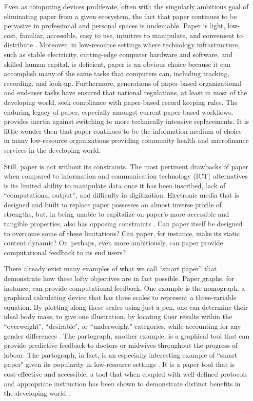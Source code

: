 \documentclass{sig-alternate}
\begin{document}
Even as computing devices proliferate, often with the singularly ambitious goal of eliminating paper from a given ecosystem, the fact that paper continues to be pervasive in professional and personal spaces is undeniable. Paper is light, low-cost, familiar, accessible, easy to use, intuitive to manipulate, and convenient to distribute \cite{sellen1997,sellen2002,johnson1993}. Moreover, in low-resource settings where technology infrastructure, such as stable electricity, cutting-edge computer hardware and software, and skilled human capital, is deficient, paper is an obvious choice because it can accomplish many of the same tasks that computers can, including tracking, recording, and look-up. Furthermore, generations of paper-based organizational and end-user tasks have ensured that national regulations, at least in most of the developing world, seek compliance with paper-based record keeping rules. The enduring legacy of paper, especially amongst current paper-based workflows, provides inertia against switching to more technically intensive replacements. It is little wonder then that paper continues to be the information medium of choice in many low-resource organizations providing community health and microfinance services in the developing world.

Still, paper is not without its constraints. The most pertinent drawbacks of paper when compared to information and communication technology (ICT) alternatives is its limited ability to manipulate data once it has been inscribed, lack of ``computational output'', and difficulty in digitization. Electronic media that is designed and built to replace paper possesses an almost inverse profile of strengths, but, in being unable to capitalize on paper's more accessible and tangible properties, also has opposing constraints \cite{johnson1993}. Can paper itself be designed to overcome some of these limitations? Can paper, for instance, make its static content dynamic? Or, perhaps, even more ambitiously, can paper provide computational feedback to its end users? 

There already exist many examples of what we call ``smart paper'' that demonstrate how these lofty objectives are in fact possible. Paper graphs, for instance, can provide computational feedback. One example is the nomograph, a graphical calculating device that has three scales to represent a three-variable equation. By plotting along these scales using just a pen, one can determine their ideal body mass, to give one illustration, by locating their results within the ``overweight", ``desirable", or ``underweight" categories, while accounting for any gender differences \cite{thomas1976}. The partograph, another example, is a graphical tool that can provide predictive feedback to doctors or midwives throughout the progress of labour\cite{who1988}. The partograph, in fact, is an especially interesting example of ``smart paper" given its popularity in low-resource settings \cite{fawole2009, umezulike1999}. It is a paper tool that is cost-effective and accessible, a tool that when coupled with well-defined protocols and appropriate instruction has been shown to demonstrate distinct benefits in the developing world \cite{fahdy2005, pettersson2000}.
\end{document}
